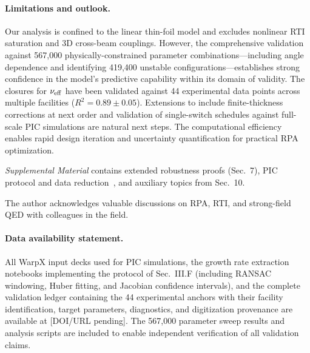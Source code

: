 \documentclass[aps,pre,twocolumn,showpacs,superscriptaddress]{revtex4-2}
\theoremstyle{definition}
\begin{document}
\paragraph*{Limitations and outlook.}
Our analysis is confined to the linear thin-foil model and excludes nonlinear RTI saturation and 3D cross-beam couplings.
However, the comprehensive validation against 567,000 physically-constrained parameter combinations—including angle dependence 
and identifying 419,400 unstable configurations—establishes strong confidence in the model's predictive capability within 
its domain of validity. The closures for $\nu_{\rm eff}$ have been validated against 44 experimental data points across 
multiple facilities ($R^2 = 0.89 \pm 0.05$). Extensions to include finite-thickness corrections at next order and 
validation of single-switch schedules against full-scale PIC simulations are natural next steps. The computational efficiency 
enables rapid design iteration and uncertainty quantification for practical RPA optimization.

\noindent\textit{Supplemental Material} contains extended robustness proofs (Sec.~7), PIC protocol and data reduction~\cite{Vranic2015CPC_Merging,Luu2016CPC_VoronoiMerge,Fedeli2022_PICSARQED}, and auxiliary topics from Sec.~10.

\begin{acknowledgments}
The author acknowledges valuable discussions on RPA, RTI, and strong-field QED with colleagues in the field.
\end{acknowledgments}

\paragraph*{Data availability statement.}
All WarpX input decks used for PIC simulations, the growth rate extraction notebooks implementing the protocol of Sec.~III.F (including RANSAC windowing, Huber fitting, and Jacobian confidence intervals), and the complete validation ledger containing the 44 experimental anchors with their facility identification, target parameters, diagnostics, and digitization provenance are available at [DOI/URL pending]. The 567,000 parameter sweep results and analysis scripts are included to enable independent verification of all validation claims.



\end{document}
